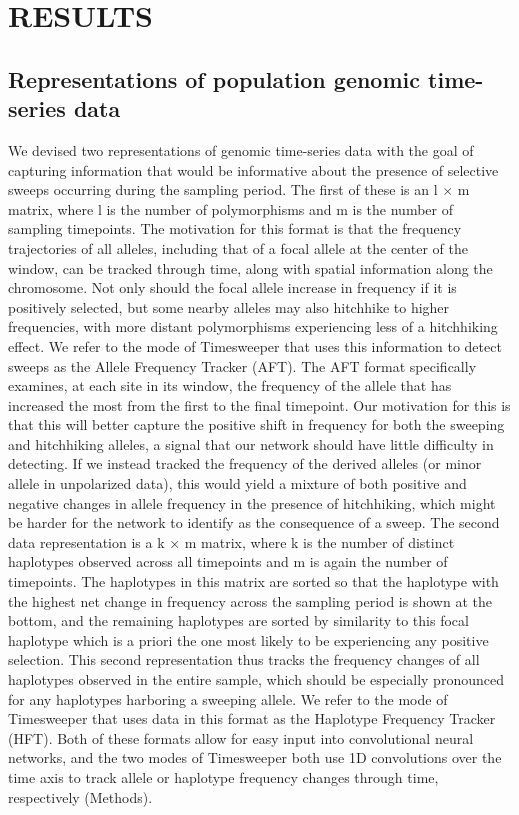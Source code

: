 \newpage
\section{RESULTS}
\subsection{Representations of population genomic time-series data}

We devised two representations of genomic time-series data with the goal of capturing information that would be informative about the presence of selective sweeps occurring during the sampling period. The first of these is an l × m matrix, where l is the number of polymorphisms and m is the number of sampling timepoints. The motivation for this format is that the frequency trajectories of all alleles, including that of a focal allele at the center of the window, can be tracked through time, along with spatial information along the chromosome. Not only should the focal allele increase in frequency if it is positively selected, but some nearby alleles may also hitchhike to higher frequencies, with more distant polymorphisms experiencing less of a hitchhiking effect. We refer to the mode of Timesweeper that uses this information to detect sweeps as the Allele Frequency Tracker (AFT). The AFT format specifically examines, at each site in its window, the frequency of the allele that has increased the most from the first to the final timepoint. Our motivation for this is that this will better capture the positive shift in frequency for both the sweeping and hitchhiking alleles, a signal that our network should have little difficulty in detecting. If we instead tracked the frequency of the derived alleles (or minor allele in unpolarized data), this would yield a mixture of both positive and negative changes in allele frequency in the presence of hitchhiking, which might be harder for the network to identify as the consequence of a sweep. 
The second data representation is a k × m matrix, where k is the number of distinct haplotypes observed across all timepoints and m is again the number of timepoints. The haplotypes in this matrix are sorted so that the haplotype with the highest net change in frequency across the sampling period is shown at the bottom, and the remaining haplotypes are sorted by similarity to this focal haplotype which is a priori the one most likely to be experiencing any positive selection. This second representation thus tracks the frequency changes of all haplotypes observed in the entire sample, which should be especially pronounced for any haplotypes harboring a sweeping allele. We refer to the mode of Timesweeper that uses data in this format as the Haplotype Frequency Tracker (HFT). Both of these formats allow for easy input into convolutional neural networks, and the two modes of Timesweeper both use 1D convolutions over the time axis to track allele or haplotype frequency changes through time, respectively (Methods).
